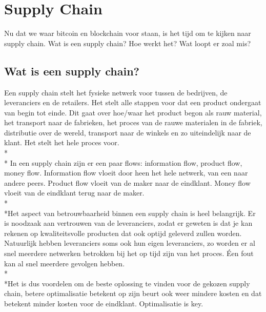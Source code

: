 \documentclass[fleqn,a4paper,12pt]{book}
\begin{document}
\chapter{Supply Chain}
Nu dat we waar bitcoin en blockchain voor staan, is het tijd om te kijken naar supply chain. Wat is een supply chain? Hoe werkt het? Wat loopt er zoal mis?

\section{Wat is een supply chain?}
Een supply chain stelt het fysieke netwerk voor tussen de bedrijven, de leveranciers en de retailers. Het stelt alle stappen voor dat een product ondergaat van begin tot einde. Dit gaat over hoe/waar het product begon als 
rauw material, het transport naar de fabrieken, het proces van de rauwe materialen in de fabriek, distributie over de wereld, transport naar de winkels en zo uiteindelijk naar de klant. Het stelt het hele proces voor.\\*\\* In een supply chain zijn er een paar flows: information flow, product flow, money flow. Information flow vloeit door heen het hele netwerk, van een naar andere peers. Product flow vloeit van de maker naar de eindklant. Money flow vloeit van de eindklant terug naar de maker.\\*\\*Het aspect van betrouwbaarheid binnen een supply chain is heel belangrijk. Er is noodzaak aan vertrouwen van de leveranciers, zodat er geweten is dat je kan rekenen op kwaliteitsvolle producten dat ook optijd geleverd zullen worden. Natuurlijk hebben leveranciers soms ook hun eigen leveranciers, zo worden er al snel meerdere netwerken betrokken bij het op tijd zijn van het proces. Éen fout kan al snel meerdere gevolgen hebben.\\*\\*Het is dus voordelen om de beste oplossing te vinden voor de gekozen supply chain, betere optimalisatie betekent op zijn beurt ook weer mindere kosten en dat betekent minder kosten voor de eindklant. Optimalisatie is key.
\end{document}
